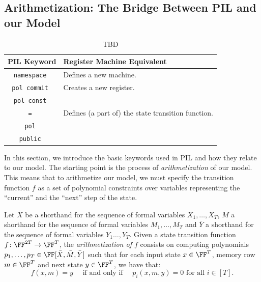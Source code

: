\subsection{Arithmetization: The Bridge Between PIL and our Model}

\begin{table}[H]
\centering
\begin{tabular}{|c|l|}
\hline
\textbf{PIL Keyword} & \textbf{Register Machine Equivalent} \\\hline
\tt{namespace} & Defines a new machine. \\\hline
\tt{pol commit} & Creates a new register. \\\hline
\tt{pol const} &  \\\hline
\tt{=} & Defines (a part of) the state transition function. \\\hline
\tt{pol} &  \\\hline
\tt{public} &  \\\hline
\end{tabular}
\caption{TBD}
\label{fig:TBD}
\end{table}

In this section, we introduce the basic keywords used in PIL and how they relate to our model. The starting point is the process of \textit{arithmetization} of our model. This means that to arithmetize our model, we must specify the transition function $f$ as a set of polynomial constraints over variables representing the \enquote{current} and the \enquote{next} step of the state.

\begin{definition}[Arithmetization]
    Let $\bar{X}$ be a shorthand for the sequence of formal variables $X_1,\dots, X_T$, $\bar{M}$ a shorthand for the sequence of formal variables $M_1,\dots, M_T$ and $\bar{Y}$ a shorthand for the sequence of formal variables $Y_1\dots, Y_T$. Given a state transition function $f \colon \FF^{2T} \to \FF^T$, the \textit{arithmetization of $f$} consists on computing polynomials $p_1,\dots,p_T \in \FF[\bar{X},\bar{M},\bar{Y}]$ such that for each input state $x \in \FF^{T}$, memory row $m \in \FF^T$ and next state $y \in \FF^T$, we have that:
    \[
        f(x,m) = y \quad \text{ if and only if } \quad p_i(x,m,y) = 0 \text{ for all } i \in [T].	
    \]
\end{definition}



